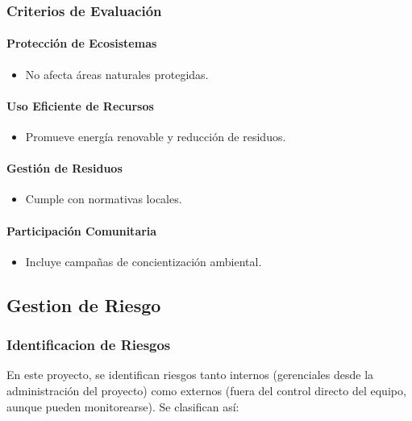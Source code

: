 \documentclass[letterpaper, 11pt]{report}
\begin{document}
\subsubsection{Criterios de Evaluación}

\paragraph{Protección de Ecosistemas}
\begin{itemize}
      \item No afecta áreas naturales protegidas.
\end{itemize}

\paragraph{Uso Eficiente de Recursos}
\begin{itemize}
      \item Promueve energía renovable y reducción de residuos.
\end{itemize}

\paragraph{Gestión de Residuos}
\begin{itemize}
      \item Cumple con normativas locales.
\end{itemize}

\paragraph{Participación Comunitaria}
\begin{itemize}
      \item Incluye campañas de concientización ambiental.
\end{itemize}

\subsection{Gestion de Riesgo}

\subsubsection{Identificacion de Riesgos}
En este proyecto, se identifican riesgos tanto internos (gerenciales desde la administración del proyecto) como externos (fuera del control directo del equipo, aunque pueden monitorearse). Se clasifican así: 
\end{document}
